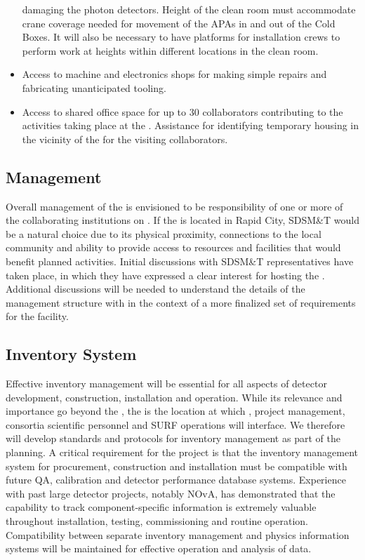 \begin{itemize}
    damaging the photon detectors.  Height of the clean room must
    accommodate crane coverage needed for movement of the APAs in and
    out of the Cold Boxes.  It will also be necessary to have
    platforms for installation crews to perform work at heights within
    different locations in the clean room.
  \item Access to machine and electronics shops for making simple
    repairs and fabricating unanticipated tooling.
  \item Access to shared office space for up to 30 collaborators
    contributing to the activities taking place at the .
    Assistance for identifying temporary housing in the vicinity of
    the  for the visiting collaborators.
\end{itemize}

\subsection{Management}

Overall management of the  is envisioned to be
responsibility of one or more of the collaborating institutions on
.  If the  is located in Rapid City, SDSM\&T
would be a natural choice due to its physical proximity, connections
to the local community and ability to provide access to resources and
facilities that would benefit planned  activities.  Initial
discussions with SDSM\&T representatives have taken place, in which
they have expressed a clear interest for hosting the .
Additional discussions will be needed to understand the details of the
 management structure with in the context of a more
finalized set of requirements for the facility.

\subsection{Inventory System}

Effective inventory management will be essential for all aspects of
 detector development, construction, installation and
operation.  While its relevance and importance go beyond the
, the  is the location at
which ,  project management, consortia
scientific personnel and SURF operations will interface.  We therefore
will develop standards and protocols for inventory management as part
of the  planning.  A critical requirement for the project
is that the inventory management system for procurement, construction
and installation must be compatible with future QA, calibration and
detector performance database systems.  Experience with past large
detector projects, notably NOvA, has demonstrated that the capability
to track component-specific information is extremely valuable
throughout installation, testing, commissioning and routine operation.
Compatibility between separate inventory management and physics
information systems will be maintained for effective operation and
analysis of  data.

